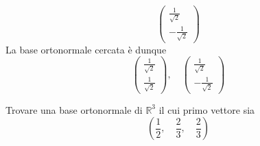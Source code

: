 \begin{example}
\[		\begin{pmatrix} \frac{1}{\sqrt{2}} \\ -\frac{1}{\sqrt{2}} \end{pmatrix}
	\]
	La base ortonormale cercata \`e dunque
	\[
		\begin{pmatrix} \frac{1}{\sqrt{2}} \\ \frac{1}{\sqrt{2}} \end{pmatrix}, \quad
		\begin{pmatrix} \frac{1}{\sqrt{2}} \\ -\frac{1}{\sqrt{2}} \end{pmatrix}
	\]
\end{example}

\begin{example}
	Trovare una base ortonormale di $\mathbb{R}^3$ il cui primo vettore sia
	\[ \left( \frac{1}{2}, \quad \frac{2}{3}, \quad \frac{2}{3} \right) \]
\end{example}